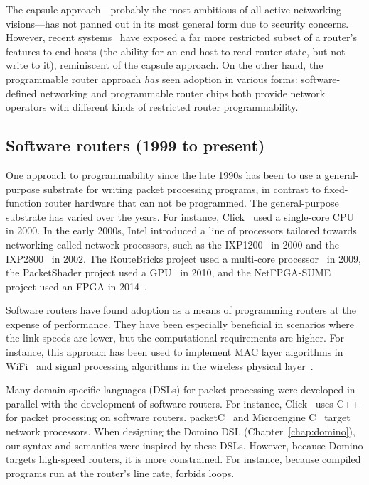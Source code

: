 The capsule approach---probably the most ambitious of all active networking
visions---has not panned out in its most general form due to security concerns.
However, recent systems~\cite{int} have exposed a far more restricted subset of
a router's features to end hosts (\eg the ability for an end host to read
router state, but not write to it), reminiscent of the capsule approach.  On
the other hand, the programmable router approach {\em has} seen adoption in
various forms: software-defined networking and programmable router chips both
provide network operators with different kinds of restricted router
programmability.

\subsection{Software routers (1999 to present)}
One approach to programmability since the late 1990s has been to use a
general-purpose substrate for writing packet processing programs, in contrast
to fixed-function router hardware that can not be programmed. The
general-purpose substrate has varied over the years. For instance,
Click~\cite{click} used a single-core CPU in 2000.  In the early 2000s, Intel
introduced a line of processors tailored towards networking called network
processors, such as the IXP1200~\cite{ixp1200} in 2000 and the
IXP2800~\cite{ixp2800} in 2002.  The RouteBricks project used a multi-core
processor~\cite{routebricks} in 2009, the PacketShader project used a GPU~\cite{packetshader} in 2010, and the NetFPGA-SUME project used
an FPGA in 2014~\cite{netfpga}.

Software routers have found adoption as a means of programming routers at the
expense of performance. They have been especially beneficial in scenarios where
the link speeds are lower, but the computational requirements are higher.  For
instance, this approach has been used to implement MAC layer algorithms in
WiFi~\cite{samplerate, roofnet, xor} and signal processing algorithms in the
wireless physical layer~\cite{sora, cloudiq}.

Many domain-specific languages (DSLs) for packet processing were developed in
parallel with the development of software routers. For instance,
Click~\cite{click} uses C++ for packet processing on software routers.
packetC~\cite{packetc} and Microengine C~\cite{microenginec} target network
processors. When designing the Domino DSL (Chapter~\ref{chap:domino}), our
syntax and semantics were inspired by these DSLs.  However, because Domino
targets high-speed routers, it is more constrained. For instance, because
compiled programs run at the router's line rate, \pktlanguage forbids loops.

